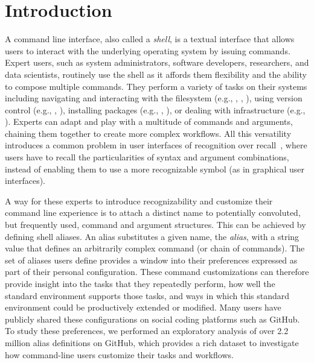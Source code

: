 \section{Introduction}

A command line interface, also called a \emph{shell}, is a textual interface that allows users to interact with the underlying operating system by issuing commands.
Expert users, such as system administrators, software developers, researchers, and data scientists, routinely use the shell as it affords them flexibility and the ability to compose multiple commands.
They perform a variety of tasks on their systems including navigating and interacting with the filesystem (e.g., , , ), using version control (e.g., , ), installing packages (e.g., , ), or dealing with infrastructure (e.g., ).
Experts can adapt and play with a multitude of commands and arguments, chaining them together to create more complex workflows.
All this versatility introduces a common problem in user interfaces of recognition over recall~\cite{nielsen:05}, where users have to recall the particularities of syntax and argument combinations, instead of enabling them to use a more recognizable symbol (as in graphical user interfaces).

A way for these experts to introduce recognizability and customize their command line experience is to attach a distinct name to potentially convoluted, but frequently used, command and argument structures.
This can be achieved by defining shell aliases.
An alias substitutes a given name, the \emph{alias}, with a string value that defines an arbitrarily complex command (or chain of commands).
The set of aliases users define provides a window into their preferences expressed as part of their personal configuration.
These command customizations can therefore provide insight into the tasks that they repeatedly perform, how well the standard environment supports those tasks, and ways in which this standard environment could be productively extended or modified.
Many users have publicly shared these configurations on social coding platforms such as GitHub.
To study these preferences, we performed an exploratory analysis of over 2.2 million alias definitions on GitHub, which provides a rich dataset to investigate how command-line users customize their tasks and workflows.

